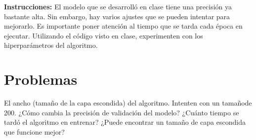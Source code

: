





\textbf{Instrucciones:} El modelo que se desarrolló en clase tiene una precisión ya bastante alta.  Sin embargo, hay varios ajustes que se pueden intentar para mejorarlo. Es importante poner atención al tiempo que se tarda cada época en ejecutar. Utilizando el código visto en clase, experimenten con  los hiperparámetros del algoritmo.

\section{Problemas}

\begin{problema}
	El ancho (tamaño de la capa escondida) del algoritmo. Intenten con un tamañode 200.  ¿Cómo cambia la precisión de validación del modelo?  ¿Cuánto tiempo se tardó el algoritmo en entrenar?  ¿Puede encontrar un tamaño de capa escondida que funcione mejor?
\end{problema}

